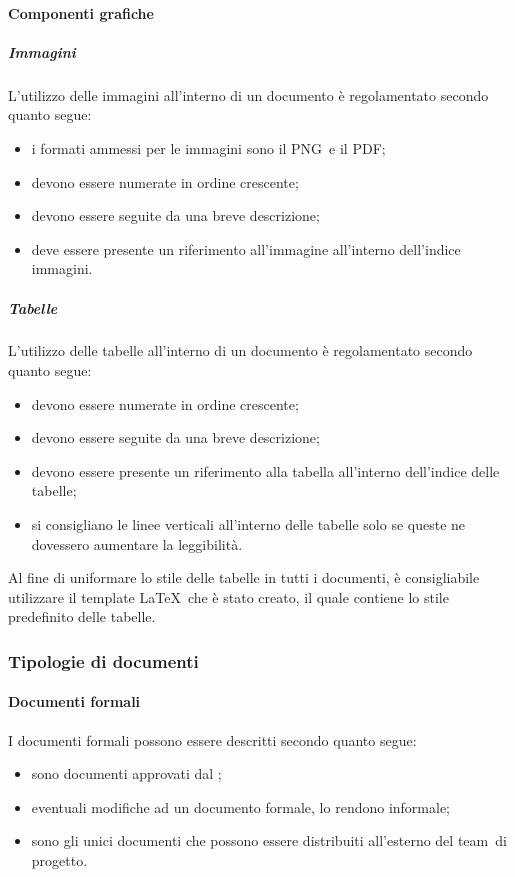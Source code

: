 \documentclass[../NormeProgetto.tex]{subfiles}
\begin{document}
		\paragraph{Componenti grafiche}
			\subparagraph{Immagini}
				L'utilizzo delle immagini all'interno di un documento è regolamentato secondo quanto segue:
				\begin{itemize}
					\item i formati ammessi per le immagini sono il PNG\g\ e il PDF\g;
					\item devono essere numerate in ordine crescente;
					\item devono essere seguite da una breve descrizione;
					\item deve essere presente un riferimento all'immagine all'interno dell'indice immagini.
				\end{itemize}
			\subparagraph{Tabelle}
				L'utilizzo delle tabelle all'interno di un documento è regolamentato secondo quanto segue:
				\begin{itemize}
					\item devono essere numerate in ordine crescente;
					\item devono essere seguite da una breve descrizione;
					\item devono essere presente un riferimento alla tabella all'interno dell'indice delle tabelle;
					\item si consigliano le linee verticali all'interno delle tabelle solo se queste ne dovessero aumentare la leggibilità.
				\end{itemize}
				Al fine di uniformare lo stile delle tabelle in tutti i documenti, è consigliabile utilizzare il template \LaTeX\ che è stato creato, il quale contiene lo stile predefinito delle tabelle.
			
	\subsubsection{Tipologie di documenti}
		\paragraph{Documenti formali}
			I documenti formali possono essere descritti secondo quanto segue:
			\begin{itemize}
				\item sono documenti approvati dal \responsabilediprogetto;
				\item eventuali modifiche ad un documento formale, lo rendono informale;
				\item sono gli unici documenti che possono essere distribuiti all'esterno del team\g\ di progetto.
			\end{itemize}
		
\end{document}
